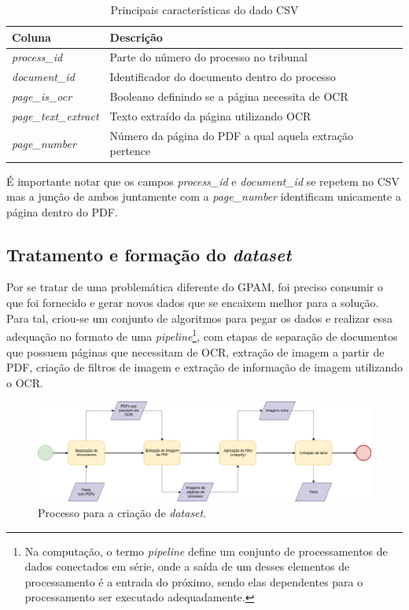 \begin{table}[h]
 \centering
 \caption{Principais características do dado CSV}
 \begin{tabular}{|m{9em}|m{20em}|}
    \hline
      \textbf{Coluna}  &
      \textbf{Descrição} \\
    \hline
      \textit{process\_id}  &
      Parte do número do processo no tribunal \\
    \hline
      \textit{document\_id}  &
      Identificador do documento dentro do processo \\
    \hline
      \textit{page\_is\_ocr}  &
      Booleano definindo se a página necessita de OCR \\
    \hline
      \textit{page\_text\_extract} &
      Texto extraído da página utilizando OCR \\
    \hline
      \textit{page\_number} &
      Número da página do PDF a qual aquela extração pertence \\
    \hline
 \end{tabular}
 \label{tab:csv-details}
\end{table}

É importante notar que os campos \textit{process\_id} e \textit{document\_id} se repetem no CSV mas a junção de ambos juntamente com a \textit{page\_number} identificam unicamente a página dentro do PDF.

\subsection{Tratamento e formação do \textit{dataset}}

Por se tratar de uma problemática diferente do GPAM, foi preciso consumir o que foi fornecido e gerar novos dados que se encaixem melhor para a solução. Para tal, criou-se um conjunto de algoritmos para pegar os dados e realizar essa adequação no formato de uma \textit{pipeline}\footnote{
  Na computação, o termo \textit{pipeline} define um conjunto de processamentos de dados conectados em série, onde a saída de um desses elementos de processamento é a entrada do próximo, sendo elas dependentes para o processamento ser executado adequadamente.
}, com etapas de separação de documentos que possuem páginas que necessitam de OCR, extração de imagem a partir de PDF, criação de filtros de imagem e extração de informação de imagem utilizando o OCR.

\begin{figure}[H]
  \includegraphics[width=\linewidth, rotate=0, center]{figuras/crappy-flow-diagram.png}
  \caption{Processo para a criação de \textit{dataset}.}
\end{figure}

